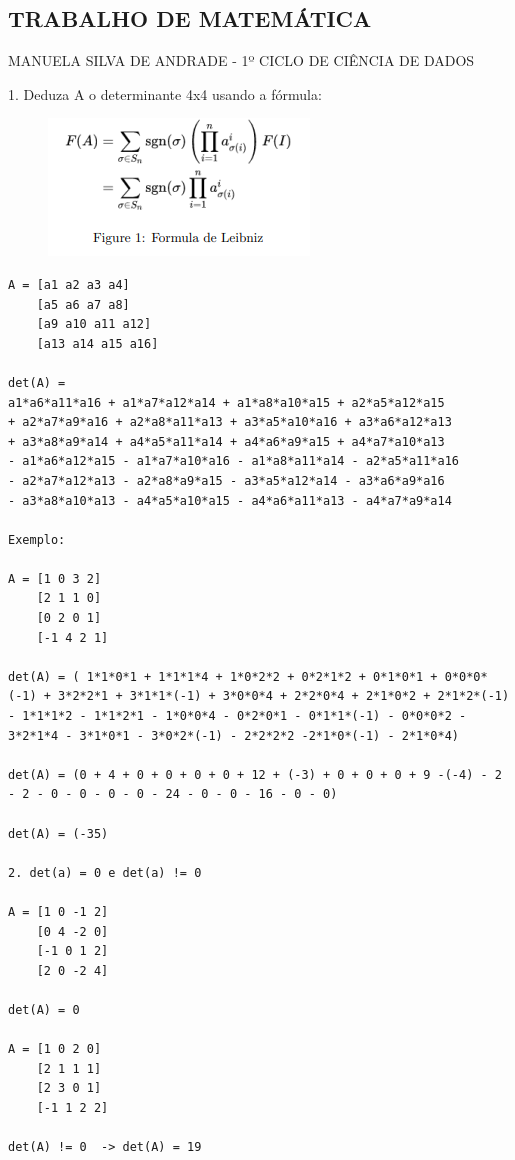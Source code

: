 \documentclass{article}
\begin{document}
\begin{center}

\subsection{TRABALHO DE MATEMÁTICA}

MANUELA SILVA DE ANDRADE - 1º CICLO DE CIÊNCIA DE DADOS

\end{center}


1. Deduza A o determinante 4x4 usando a fórmula:

\begin{figure}[h]
    \centering
    \includegraphics{Captura de tela 2023-05-09 075535.png}
    \label{fig:my_label}
\end{figure}

\begin{lstlisting}    
A = [a1 a2 a3 a4]
    [a5 a6 a7 a8]
    [a9 a10 a11 a12]
    [a13 a14 a15 a16]

det(A) =
a1*a6*a11*a16 + a1*a7*a12*a14 + a1*a8*a10*a15 + a2*a5*a12*a15
+ a2*a7*a9*a16 + a2*a8*a11*a13 + a3*a5*a10*a16 + a3*a6*a12*a13
+ a3*a8*a9*a14 + a4*a5*a11*a14 + a4*a6*a9*a15 + a4*a7*a10*a13
- a1*a6*a12*a15 - a1*a7*a10*a16 - a1*a8*a11*a14 - a2*a5*a11*a16
- a2*a7*a12*a13 - a2*a8*a9*a15 - a3*a5*a12*a14 - a3*a6*a9*a16
- a3*a8*a10*a13 - a4*a5*a10*a15 - a4*a6*a11*a13 - a4*a7*a9*a14

Exemplo:

A = [1 0 3 2]
    [2 1 1 0]
    [0 2 0 1]
    [-1 4 2 1]

det(A) = ( 1*1*0*1 + 1*1*1*4 + 1*0*2*2 + 0*2*1*2 + 0*1*0*1 + 0*0*0*(-1) + 3*2*2*1 + 3*1*1*(-1) + 3*0*0*4 + 2*2*0*4 + 2*1*0*2 + 2*1*2*(-1) - 1*1*1*2 - 1*1*2*1 - 1*0*0*4 - 0*2*0*1 - 0*1*1*(-1) - 0*0*0*2 - 3*2*1*4 - 3*1*0*1 - 3*0*2*(-1) - 2*2*2*2 -2*1*0*(-1) - 2*1*0*4)

det(A) = (0 + 4 + 0 + 0 + 0 + 0 + 12 + (-3) + 0 + 0 + 0 + 9 -(-4) - 2 - 2 - 0 - 0 - 0 - 0 - 24 - 0 - 0 - 16 - 0 - 0)

det(A) = (-35)

2. det(a) = 0 e det(a) != 0

A = [1 0 -1 2]
    [0 4 -2 0]
    [-1 0 1 2]
    [2 0 -2 4]
    
det(A) = 0

A = [1 0 2 0]
    [2 1 1 1]
    [2 3 0 1]
    [-1 1 2 2]
    
det(A) != 0  -> det(A) = 19

\end{lstlisting}
\end{document}
